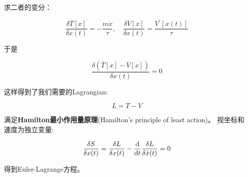 求二者的变分\cite{Lancaster2014}：

$$
\frac{\delta \overline T[x]}{\delta x(t)} = - \frac{m \ddot x}{\tau}, \quad
\frac{\delta \overline V[x]}{\delta x(t)} = \frac{V^\prime[x(t)]}{\tau}
$$

于是

$$
\frac{\delta (\overline T[x] - \overline V[x])}{\delta x(t)} = 0
$$

这样得到了我们需要的Lagrangian:

$$
L = T - V
$$

满足\textbf{Hamilton最小作用量原理}(Hamilton's principle of least action)。
视坐标和速度为独立变量:

$$
\frac{\delta S}{\delta x(t)} 
= \frac{\delta L}{\delta x(t)} - \frac{\text d}{\text d t} \frac{\delta L}{\delta \dot x(t)} 
= 0
$$

得到Euler-Lagrange方程。


\cite{MarsdenRatiu1994}


